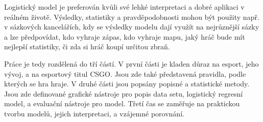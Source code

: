 Logistický model je preferován kvůli své lehké interpretaci a 
dobré aplikaci v reálném životě. Výsledky, statistiky a pravděpodobnosti mohou být použity např. v sázkových kancelářích, kdy se výsledky modelu
dají využít na nejrůznější sázky 
{\color{red}
a lze předpovídat,
}
kdo vyhraje zápas, kdo vyhraje mapu, jaký hráč bude mít nejlepší statistiky, či zda si hráč koupí určitou zbraň.

{\color{red}
Práce je tedy rozdělená do tří částí. V první části je kladen důraz na esport, jeho vývoj, a na esportový titul \ac{CSGO}. Jsou zde také představená pravidla, podle kterých se
hra hraje. V druhé části jsou popsány popisné a statistické metody. Jsou zde definované grafické nástroje pro popis data setu, logistický regresní model, a evaluační nástroje
pro model. Třetí čas se zaměřuje na praktickou tvorbu modelů, jejich interpretaci, a vzájemné porovnání.
}
